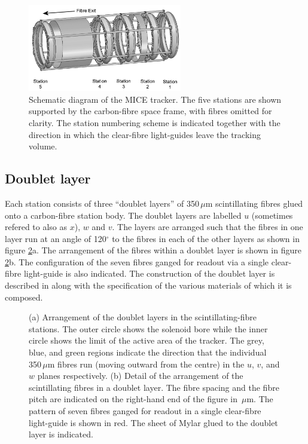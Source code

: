 \begin{figure}
  \includegraphics[width=0.6\textwidth]{detectors/tracker/02-Definitions/Figures/StnNum.pdf}
  \caption{Schematic diagram of the MICE tracker. The five stations are shown supported by the carbon-fibre space frame, with fibres omitted for clarity. The station numbering scheme is indicated together with the direction in which the clear-fibre light-guides leave the tracking volume.}
  \label{Fig:StnNum}
\end{figure}

\subsection{Doublet layer}
\label{SubSect:SciFiDblLyr}

Each station consists of three ``doublet layers'' of 350\,$\mu$m scintillating fibres glued onto a carbon-fibre station body. The doublet layers are labelled $u$ (sometimes refered to also as $x$), $w$ and $v$.  The layers are arranged such that the fibres in one layer run at an angle of 120$^\circ$ to the fibres in each of the other layers as shown in figure \ref{Fig:DblLyr}a.   The arrangement of the fibres within a doublet layer is shown in figure \ref{Fig:DblLyr}b.   The configuration of the seven fibres ganged for readout via a single clear-fibre light-guide is also indicated. The construction of the doublet layer is described in \cite{TrackerPaper} along with the specification of the various materials of which it is composed.
\begin{figure}
  \caption{(a) Arrangement of the doublet layers in the scintillating-fibre  stations. The outer circle shows the solenoid bore while the inner circle shows the limit of the active area of the tracker. The grey, blue, and green regions indicate the direction that the individual 350\,$\mu$m fibres run (moving outward from the centre) in the $u$, $v$, and $w$ planes respectively. (b) Detail of the arrangement of the scintillating fibres in a doublet layer. The fibre spacing and the fibre pitch are indicated on the right-hand end of the figure in \,$\mu$m. The pattern of seven fibres ganged for readout in a single clear-fibre light-guide is shown in red. The sheet of Mylar glued to the doublet layer is indicated.}
  \label{Fig:DblLyr}
\end{figure}

